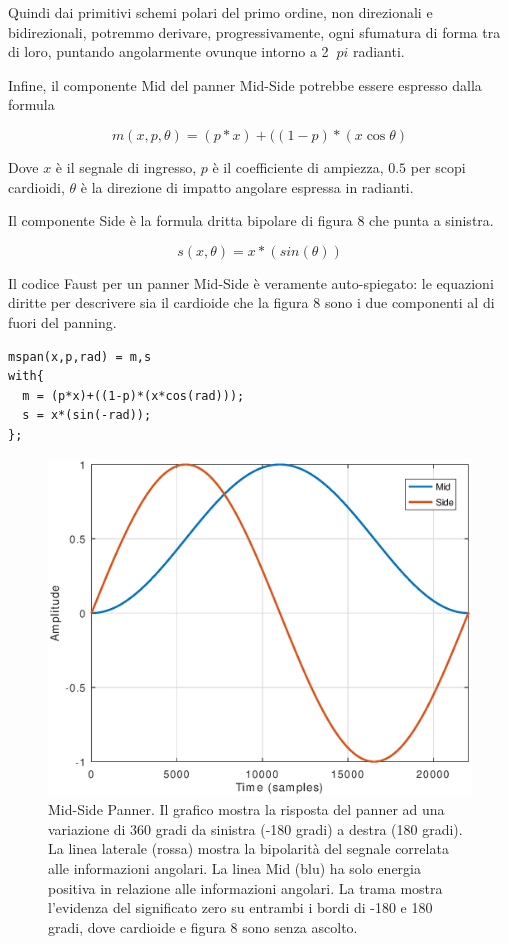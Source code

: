 Quindi dai primitivi schemi polari del primo ordine, non direzionali e
bidirezionali, potremmo derivare, progressivamente, ogni sfumatura di forma tra
di loro, puntando angolarmente ovunque intorno a 2 $ \ pi $ radianti.

Infine, il componente Mid del panner Mid-Side potrebbe essere espresso dalla
formula

\begin{equation}
m(x,p,\theta) = (p*x) + ((1-p)*(x\cos\theta)
\label{eq:mid}
\end{equation}

Dove $ x $ è il segnale di ingresso, $ p $ è il coefficiente di ampiezza, $0.5$
per scopi cardioidi, $\theta$ è la direzione di impatto angolare espressa in
radianti.

Il componente Side è la formula dritta bipolare di figura 8 che punta a sinistra.

\begin{equation}
s(x,\theta) = x*(sin(\theta))
\label{eq:mid}
\end{equation}

Il codice Faust per un panner Mid-Side è veramente auto-spiegato: le equazioni
diritte per descrivere sia il cardioide che la figura 8 sono i due componenti
al di fuori del panning.

\begin{lstlisting}
mspan(x,p,rad) = m,s
with{
  m = (p*x)+((1-p)*(x*cos(rad)));
  s = x*(sin(-rad));
};
\end{lstlisting}

\begin{figure}[h]
\centering
\includegraphics[width=1\columnwidth]{CAPITOLI/1000/IMG/mspan}
\caption{Mid-Side Panner. Il grafico mostra la risposta del panner ad una
variazione di 360 gradi da sinistra (-180 gradi) a destra (180 gradi). La linea
laterale (rossa) mostra la
bipolarità del segnale correlata alle informazioni angolari. La linea Mid (blu)
ha solo energia positiva in relazione alle informazioni angolari. La trama
mostra l'evidenza del significato zero su entrambi i bordi di -180 e 180 gradi,
dove cardioide e figura 8 sono senza ascolto.}
\label{fig:mspan}
\end{figure}

